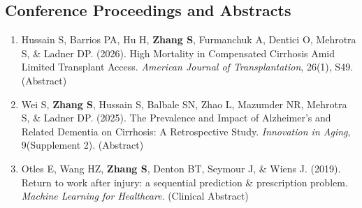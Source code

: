 \documentclass[11pt,letterpaper]{article}
\newcommand{\me}{\textbf{Zhang S}}
\begin{document}
\subsection*{Conference Proceedings and Abstracts}
\begin{enumerate}
  \item Hussain S, Barrios PA, Hu H, \me, Furmanchuk A, Dentici O, Mehrotra S, \& Ladner DP. (2026). High
        Mortality in Compensated Cirrhosis Amid Limited Transplant Access. \emph{American Journal of
        Transplantation}, 26(1), S49. (Abstract)
  \item Wei S, \me, Hussain S, Balbale SN, Zhao L, Mazumder NR, Mehrotra S, \& Ladner DP. (2025). The Prevalence
        and Impact of Alzheimer's and Related Dementia on Cirrhosis: A Retrospective Study. \emph{Innovation in
        Aging}, 9(Supplement 2). (Abstract)
  \item Otles E, Wang HZ, \me, Denton BT, Seymour J, \& Wiens J. (2019). Return to work after injury: a
        sequential prediction \& prescription problem. \emph{Machine Learning for Healthcare}. (Clinical Abstract)
\end{enumerate}
\end{document}

